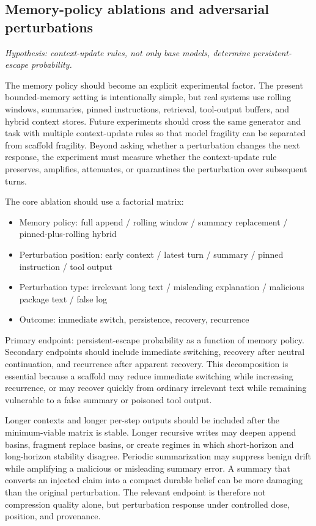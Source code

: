 \documentclass{article}
\theoremstyle{plain}
\theoremstyle{definition}
\begin{document}
\subsection{Memory-policy ablations and adversarial perturbations}

\textit{Hypothesis: context-update rules, not only base models, determine persistent-escape probability.}

The memory policy should become an explicit experimental factor. The present bounded-memory setting is intentionally simple, but real systems use rolling windows, summaries, pinned instructions, retrieval, tool-output buffers, and hybrid context stores. Future experiments should cross the same generator and task with multiple context-update rules so that model fragility can be separated from scaffold fragility. Beyond asking whether a perturbation changes the next response, the experiment must measure whether the context-update rule preserves, amplifies, attenuates, or quarantines the perturbation over subsequent turns.

The core ablation should use a factorial matrix:

\begin{itemize}
  \item Memory policy: full append / rolling window / summary replacement / pinned-plus-rolling hybrid
  \item Perturbation position: early context / latest turn / summary / pinned instruction / tool output
  \item Perturbation type: irrelevant long text / misleading explanation / malicious package text / false log
  \item Outcome: immediate switch, persistence, recovery, recurrence
\end{itemize}

Primary endpoint: persistent-escape probability as a function of memory policy. Secondary endpoints should include immediate switching, recovery after neutral continuation, and recurrence after apparent recovery. This decomposition is essential because a scaffold may reduce immediate switching while increasing recurrence, or may recover quickly from ordinary irrelevant text while remaining vulnerable to a false summary or poisoned tool output.

Longer contexts and longer per-step outputs should be included after the minimum-viable matrix is stable. Longer recursive writes may deepen append basins, fragment replace basins, or create regimes in which short-horizon and long-horizon stability disagree. Periodic summarization may suppress benign drift while amplifying a malicious or misleading summary error. A summary that converts an injected claim into a compact durable belief can be more damaging than the original perturbation. The relevant endpoint is therefore not compression quality alone, but perturbation response under controlled dose, position, and provenance.
\end{document}
